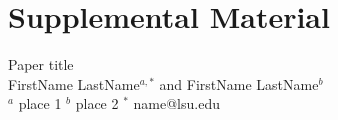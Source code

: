\documentclass[12pt]{dallasLab}
\begin{document}
\newpage
\begin{figure}[h!]
  \begin{center}
    \caption{}
    \label{fig:}
  \end{center}
\end{figure}










\clearpage
\newcommand{\beginsupplement}{%
        \setcounter{page}{1}
        \setcounter{table}{0}
        \renewcommand{\thetable}{S\arabic{table}}%
        \setcounter{figure}{0}
        \renewcommand{\thefigure}{S\arabic{figure}}%
        }


\section*{Supplemental Material}

{\large Paper title} \\


\noindent FirstName LastName$^{a,*}$ and  FirstName LastName$^{b}$  \\

\noindent $^{a}$ place 1
\noindent $^{b}$ place 2
\noindent $^{*}$ name@lsu.edu \\


\beginsupplement
\end{document}
